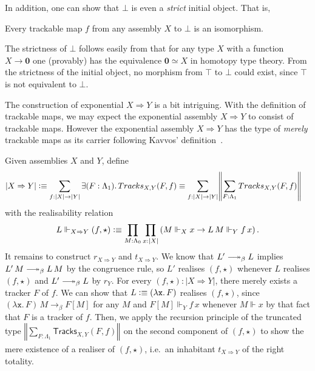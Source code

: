 \documentclass[a4paper,UKenglish,numberwithinsect,cleveref,thm-restate]{lipics-v2021}
\newcommand{\eqv}[2]{\ensuremath{#1 \simeq #2}\xspace}
\newcommand{\trunc}[2]{\mathopen{}\left\Vert #2\right\Vert_{#1}\mathclose{}}
\newcommand{\brck}[1]{\trunc{}{#1}}
\newcommand{\barred}[1]{\mathopen{}\left|{#1}\right|\mathclose{}}
\newcommand{\defeq}{\vcentcolon\equiv}
\newcommand{\Empty}{\mathbf{0}}
\DeclareRobustCommand\longtwoheadrightarrow{\relbar\joinrel\twoheadrightarrow}
\newcommand{\reduce}{\longtwoheadrightarrow_{\beta}}
\newcommand{\onereduce}{\longrightarrow_{\beta}}
\theoremstyle{plain}
\begin{document}
In addition, one can show that $\bot$ is even a \emph{strict} initial object. That is, 
\begin{proposition}\label{prop:strict-initial}
  Every trackable map $f$ from any assembly $X$ to $\bot$ is an isomorphism. 
\end{proposition}
The strictness of $\bot$ follows easily from that for any type $X$ with a function $X \to \Empty$ one (provably) has the equivalence $\eqv{\Empty}{X}$ in homotopy type theory.
From the strictness of the initial object, no morphism from $\top$ to $\bot$ could exist, since $\top$ is not equivalent to $\bot$.

The construction of exponential $X \Rightarrow Y$ is a bit intriguing.
With the definition of trackable maps, we may expect the exponential assembly $X \Rightarrow Y$ to consist of trackable maps.
However the exponential assembly $X \Rightarrow Y$ has the type of \emph{merely} trackable maps as its carrier following Kavvos' definition~\cite{Kavvos2017c}.  
\begin{example}[Exponentials]
  Given assemblies $X$ and $Y$, define
  \begin{align*}
    \barred{X \Rightarrow Y} & \defeq \sum_{f : |X| \to |Y|} \exists (F : \Lambda_1).\, \mathsf{Tracks}_{X, Y}(F, f) \equiv \sum_{f : |X| \to |Y|} \brck{\sum_{F : \Lambda_1} \mathsf{Tracks}_{X, Y}(F, f) }
  \end{align*}
  with the realisability relation 
  \[
    L \Vdash_{X \Rightarrow Y} (f, \star) \defeq \prod_{M : \Lambda_0} \prod_{x : |X|}\left( M \Vdash_X x \to L\,M \Vdash_Y f\,x\right).
  \]
  It remains to construct $r_{X\Rightarrow Y}$ and $t_{X \Rightarrow Y}$. 
  We know that $L' \reduce L$ implies $L'\,M \reduce L\,M$ by the congruence rule, so $L'$ realises $(f, \star)$ whenever $L$ realises $(f, \star)$ and $L' \reduce L$ by $r_Y$.
  For every $(f, \star) : |X \Rightarrow Y|$, there merely exists a tracker $F$ of $f$.
  We can show that $L \defeq \left(\mathtt{\lambda x}.\,F\right)$ realises $(f, \star)$, since
  $\left(\mathtt{\lambda x}.\,F\right)\,M \onereduce F[M]$ for any $M$ and $F[M] \Vdash_Y f\,x$ whenever $M \Vdash x$
  by that fact that $F$ is a tracker of $f$.
  Then, we apply the recursion principle of the truncated type $\brck{\sum_{F : \Lambda_1} \mathsf{Tracks}_{X, Y}(F, f) }$ on the second component of $(f, \star)$ to show the mere existence of a realiser of $(f, \star)$, i.e.\ an inhabitant $t_{X \Rightarrow Y}$ of the right totality.

\end{example}
\end{document}
